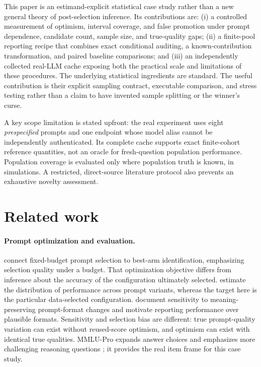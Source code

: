 \documentclass{article}
\begin{document}
This paper is an estimand-explicit statistical case study rather than a new general theory of post-selection inference. Its contributions are: (i) a controlled measurement of optimism, interval coverage, and false promotion under prompt dependence, candidate count, sample size, and true-quality gaps; (ii) a finite-pool reporting recipe that combines exact conditional auditing, a known-contribution transformation, and paired baseline comparisons; and (iii) an independently collected real-LLM cache exposing both the practical scale and limitations of these procedures. The underlying statistical ingredients are standard. The useful contribution is their explicit sampling contract, executable comparison, and stress testing rather than a claim to have invented sample splitting or the winner's curse.

A key scope limitation is stated upfront: the real experiment uses eight \emph{prespecified} prompts and one endpoint whose model alias cannot be independently authenticated. Its complete cache supports exact finite-cohort reference quantities, not an oracle for fresh-question population performance. Population coverage is evaluated only where population truth is known, in simulations. A restricted, direct-source literature protocol also prevents an exhaustive novelty assessment.

\section{Related work}
\paragraph{Prompt optimization and evaluation.}
\citet{shi2024} connect fixed-budget prompt selection to best-arm identification, emphasizing selection quality under a budget. That optimization objective differs from inference about the accuracy of the configuration ultimately selected. \citet{polo2024} estimate the distribution of performance across prompt variants, whereas the target here is the particular data-selected configuration. \citet{sclar2024} document sensitivity to meaning-preserving prompt-format changes and motivate reporting performance over plausible formats. Sensitivity and selection bias are different: true prompt-quality variation can exist without reused-score optimism, and optimism can exist with identical true qualities. MMLU-Pro expands answer choices and emphasizes more challenging reasoning questions \citep{wang2024}; it provides the real item frame for this case study.
\end{document}
